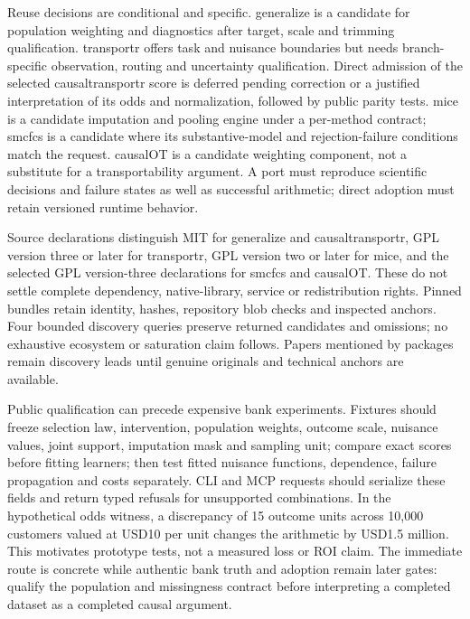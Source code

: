 Reuse decisions are conditional and specific. generalize is a candidate for population weighting and diagnostics after target, scale and trimming qualification. transportr offers task and nuisance boundaries but needs branch-specific observation, routing and uncertainty qualification. Direct admission of the selected causaltransportr score is deferred pending correction or a justified interpretation of its odds and normalization, followed by public parity tests. mice is a candidate imputation and pooling engine under a per-method contract; smcfcs is a candidate where its substantive-model and rejection-failure conditions match the request. causalOT is a candidate weighting component, not a substitute for a transportability argument. A port must reproduce scientific decisions and failure states as well as successful arithmetic; direct adoption must retain versioned runtime behavior.~\citep{exec25_rtm_choice}

Source declarations distinguish MIT for generalize and causaltransportr, GPL version three or later for transportr, GPL version two or later for mice, and the selected GPL version-three declarations for smcfcs and causalOT. These do not settle complete dependency, native-library, service or redistribution rights. Pinned bundles retain identity, hashes, repository blob checks and inspected anchors. Four bounded discovery queries preserve returned candidates and omissions; no exhaustive ecosystem or saturation claim follows. Papers mentioned by packages remain discovery leads until genuine originals and technical anchors are available.~\citep{exec25_rtm_generalize,exec25_rtm_transportr,exec25_rtm_causaltransportr,exec25_rtm_mice,exec25_rtm_smcfcs,exec25_rtm_causalOT,exec25_rtm_choice}

Public qualification can precede expensive bank experiments. Fixtures should freeze selection law, intervention, population weights, outcome scale, nuisance values, joint support, imputation mask and sampling unit; compare exact scores before fitting learners; then test fitted nuisance functions, dependence, failure propagation and costs separately. CLI and MCP requests should serialize these fields and return typed refusals for unsupported combinations. In the hypothetical odds witness, a discrepancy of 15 outcome units across 10,000 customers valued at USD10 per unit changes the arithmetic by USD1.5 million. This motivates prototype tests, not a measured loss or ROI claim. The immediate route is concrete while authentic bank truth and adoption remain later gates: qualify the population and missingness contract before interpreting a completed dataset as a completed causal argument.~\citep{exec25_rtm_choice}

